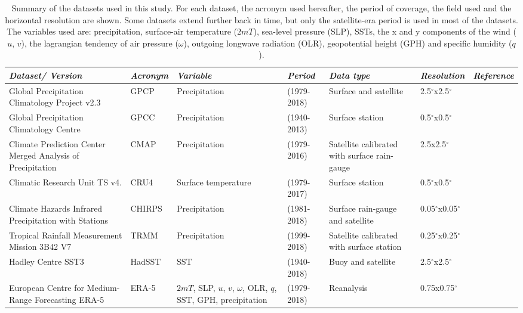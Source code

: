 \begin{sidewaystable}%
\small
\caption{Summary of the datasets used in this study. For each dataset, the acronym used hereafter, the period of coverage, the field used and the horizontal resolution are shown. Some datasets extend further back in time, but only the satellite-era period is used in most of the datasets.
The variables used are: precipitation, surface-air temperature ($2mT$), sea-level pressure (SLP), SSTs, the x and y components of the wind ($u$, $v$), the lagrangian tendency of air pressure ($\omega$), outgoing longwave radiation (OLR), geopotential height (GPH) and specific humidity ($q$).}
\begin{tabular}{p{5cm}|p{1.47cm}p{3.45cm}p{2.12cm}p{4.2cm}p{2.12cm}p{3.54cm}} \label{tab:1}
\textit{Dataset/ Version}                    & \textit{Acronym} & \textit{Variable} & \textit{Period} & \textit{Data type}             & \textit{Resolution} & \textit{Reference}                 \\ \hline \hline
Global Precipitation Climatology Project v2.3 & GPCP       & Precipitation       &   (1979-2018)       &  Surface and satellite & 2.5$^\circ$x2.5$^\circ$  & \citep{adler2003}               \\
 Global Precipitation Climatology Centre    & GPCC          & Precipitation       & (1940-2013)       &  Surface station                 &  0.5$^\circ$x0.5$^\circ$ & \citep{becker2011}              \\
Climate Prediction Center Merged Analysis of Precipitation & CMAP      & Precipitation       &   (1979-2016)       & Satellite calibrated with surface rain-gauge & 2.5x2.5$^\circ$  & \citep{xie1997}     \\
Climatic Research Unit TS  v4.     & CRU4         & Surface temperature  & (1979-2017)       &  Surface station    &  0.5$^\circ$x0.5$^\circ$   &        \citep{harris2014}                            \\
  Climate Hazards Infrared Precipitation with Stations   & CHIRPS          & Precipitation       & (1981-2018)       &  Surface rain-gauge and satellite               &  0.05$^\circ$x0.05$^\circ$ & \citep{funk2015}              \\
Tropical Rainfall Measurement Mission 3B42 V7       & TRMM          & Precipitation       & (1999-2018)   & Satellite calibrated with surface station   & 0.25$^\circ$x0.25$^\circ$  &  \citep{mission2011} \\
Hadley Centre SST3                           & HadSST          & SST               & (1940-2018)   & Buoy and satellite              & 2.5$^\circ$x2.5$^\circ$  &  \citep{kennedy2011} \\
European Centre for Medium-Range Forecasting ERA-5                            & ERA-5             & $2mT$, SLP, $u$, $v$, $\omega$, OLR, $q$, SST, GPH, precipitation    &  (1979-2018)    &  Reanalysis       & 0.75x0.75$^\circ$ &  \citep{era5,era5hersbach}
\end{tabular}

\end{sidewaystable}
